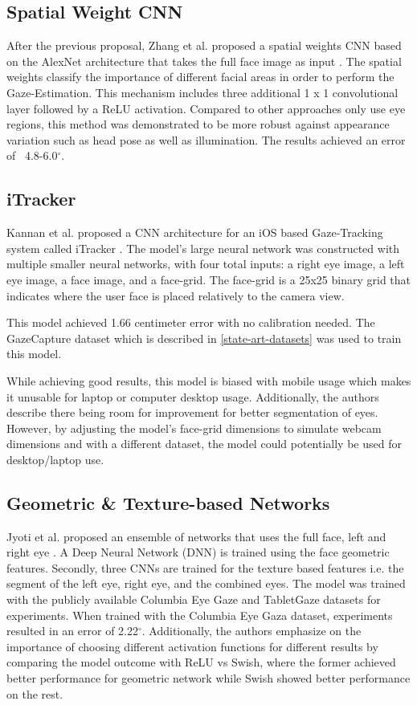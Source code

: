 \subsection{Spatial Weight CNN}
After the previous proposal, Zhang et al. proposed a spatial weights CNN based on the AlexNet architecture \cite{alex_net} that takes the full face image as input \cite{written_all_over_your_face}. The spatial weights classify the importance of different facial areas in order to perform the Gaze-Estimation. This mechanism includes three additional 1 x 1 convolutional layer followed by a ReLU activation. Compared to other approaches only use eye regions, this method was demonstrated to be more robust against appearance variation such as head pose as well as illumination. The results achieved an error of ~4.8-6.0$^{\circ}$.

\subsection{iTracker}
Kannan et al. proposed a CNN architecture for an iOS based Gaze-Tracking system called iTracker \cite{iTracker}. The model's large neural network was constructed with multiple smaller neural networks, with four total inputs: a right eye image, a left eye image, a face image, and a face-grid. The face-grid is a 25x25 binary grid that indicates where the user face is placed relatively to the camera view. 

This model achieved 1.66 centimeter error with no calibration needed. The GazeCapture dataset which is described in \autoref{state-art-datasets} was used to train this model.

While achieving good results, this model is biased with mobile usage which makes it unusable for laptop or computer desktop usage. Additionally, the authors describe there being room for improvement for better segmentation of eyes. However, by adjusting the model's face-grid dimensions to simulate webcam dimensions and with a different dataset, the model could potentially be used for desktop/laptop use.

\subsection{Geometric \& Texture-based Networks}
Jyoti et al. proposed an ensemble of networks that uses the full face, left and right eye \cite{jyoti_automatic_2018}.
A Deep Neural Network (DNN) is trained using the face geometric features. Secondly, three CNNs are trained for the texture based features i.e. the segment of the left eye, right eye, and the combined eyes. The model was trained with the publicly available Columbia Eye Gaze and TabletGaze datasets for experiments. When trained with the Columbia Eye Gaza dataset, experiments resulted in an error of 2.22$^{\circ}$. Additionally, the authors emphasize on the importance of choosing
different activation functions for different results by comparing the model outcome with ReLU vs Swish, where the former achieved better performance for geometric network while Swish showed better performance on the rest.

